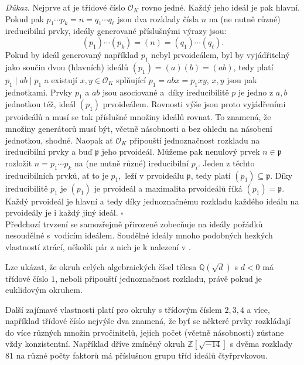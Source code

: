 \documentclass[12pt]{report}
\begin{document}
\noindent \textit{Důkaz.} Nejprve ať je třídové číslo $\mathcal{O}_K$ rovno jedné. Každý jeho ideál je pak hlavní. Pokud pak $p_1 \cdots p_k = n = q_1 \cdots q_{\ell}$ jsou dva rozklady čísla $n$ na (ne nutně různé) ireducibilní prvky, ideály generované příslušnými výrazy jsou:
\begin{equation*}
(p_1) \cdots (p_k) = (n) = (q_1) \cdots (q_\ell).
\end{equation*}
Pokud by ideál generovaný například $p_1$ nebyl prvoideálem, byl by vyjádřitelný jako součin dvou (hlavních) ideálů $(p_1) = (a)(b) = (ab)$, tedy platí $p_1 \mid ab \mid p_1$ a existují $x,y \in \mathcal{O}_K$ splňující $p_1 = abx = p_1 xy$, $x,y$ jsou pak jednotkami. Prvky $p_1$ a $ab$ jsou asociované a~díky ireducibilitě $p$ je jedno z $a,b$ jednotkou též, ideál $(p_1)$ prvoideálem. Rovnosti výše jsou proto vyjádřeními prvoideálů a musí se tak příslušné množiny ideálů rovnat. To znamená, že množiny generátorů musí být, včetně násobnosti a bez ohledu na násobení jednotkou, shodné. Naopak ať $\mathcal{O}_K$ připouští jednoznačnost rozkladu na ireducibilní prvky a buď $\mathfrak{p}$ jeho prvoideál. Můžeme pak nenulový prvek $n \in \mathfrak{p}$ rozložit $n = p_1 \cdots p_k$  na (ne nutně různé) ireducibilní $p_i$. Jeden z těchto ireducibilních prvků, ať to je $p_1,$ leží v prvoideálu $\mathfrak{p}$, tedy platí $(p_1) \subseteq \mathfrak{p}$. Díky ireducibilitě $p_1$ je $(p_1)$ je prvoideál a maximalita prvoideálů říká $(p_1) = \mathfrak{p}$. Každý prvoideál je hlavní a tedy díky jednoznačnému rozkladu každého ideálu na prvoideály je i každý jiný ideál. \hfill $\square$\\

Předchozí trvzení se samozřejmě přirozeně zobecňuje na ideály pořádků nesoudělné s~vodícím ideálem. Soudělné ideály mnoho podobných hezkých vlastností ztrácí, několik pár z nich je k nalezení v \cite[Ch. 3.]{Conrad3}.

\begin{poznamka}
Lze ukázat, že okruh celých algebraických čísel tělesa $\mathbb{Q}(\sqrt{d})$ s $d < 0$ má třídové číslo $1$, neboli připouští jednoznačnost rozkladu, právě pokud je euklidovým okruhem.
\end{poznamka}

Další zajímavé vlastnosti platí pro okruhy s třídovým číslem $2,3,4$ a více, například třídové číslo nejvýše dva znamená, že byť se některé prvky rozkládají do více různých množin prvočinitelů, jejich počet (včetně násobnosti) zůstane vždy konzistentní. Například dříve zmíněný okruh $\mathbb{Z}[\sqrt{-14}]$ s dvěma rozklady $81$ na různé počty faktorů má příslušnou grupu tříd ideálů čtyřprvkovou.
\end{document}
